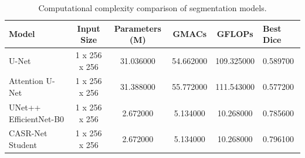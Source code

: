 \begin{table}
\caption{Computational complexity comparison of segmentation models.}
\label{tab:gflops_comparison}
\begin{tabular}{lcccc}
\toprule
Model & Input Size & Parameters (M) & GMACs & GFLOPs & Best Dice \\
\midrule
U-Net & 1 x 256 x 256 & 31.036000 & 54.662000 & 109.325000 & 0.589700 \\
Attention U-Net & 1 x 256 x 256 & 31.388000 & 55.772000 & 111.543000 & 0.577200 \\
UNet++ EfficientNet-B0 & 1 x 256 x 256 & 2.672000 & 5.134000 & 10.268000 & 0.785600 \\
CASR-Net Student & 1 x 256 x 256 & 2.672000 & 5.134000 & 10.268000 & 0.796100 \\
\bottomrule
\end{tabular}
\end{table}
